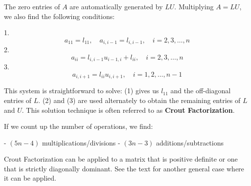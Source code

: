 \documentclass[12pt]{article}
\begin{document}
The zero entries of $A$ are automatically generated by $LU$. Multiplying
$A = LU$, we also find the following conditions:

1. \[ a_{11} = l_{11}, \quad a_{i,i-1} = l_{i,i-1}, \quad i = 2,3,\dots,n \]
2. \[ a_{ii} = l_{i,i-1} u_{i-1,i} + l_{ii}, \quad i = 2,3,\dots,n \]
3. \[ a_{i,i+1} = l_{ii} u_{i,i+1}, \quad i = 1,2,\dots,n-1 \]

This system is straightforward to solve: (1) gives us $l_{11}$ and the 
off-diagonal entries of $L$. (2) and (3) are used alternately to obtain 
the remaining entries of $L$ and $U$. This solution technique is often referred
to as \textbf{Crout Factorization}.

If we count up the number of operations, we find:

- $(5n - 4)$ multiplications/divisions
- $(3n - 3)$ additions/subtractions

Crout Factorization can be applied to a matrix that is positive definite or one
that is strictly diagonally dominant. See the text for another general case 
where it can be applied.
\end{document}
